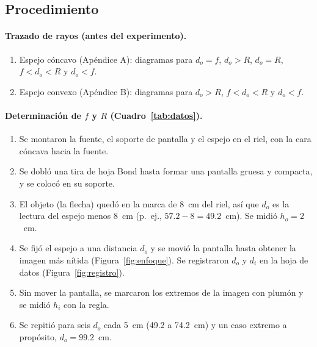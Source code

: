 \documentclass[11pt,a4paper]{article}
\begin{document}
\subsection{Procedimiento}

\paragraph{Trazado de rayos (antes del experimento).}
\begin{enumerate}
  \item Espejo cóncavo (Apéndice A): diagramas para $d_o = f$, $d_o > R$, $d_o = R$, $f < d_o < R$ y $d_o < f$.
  \item Espejo convexo (Apéndice B): diagramas para $d_o > R$, $f < d_o < R$ y $d_o < f$.
\end{enumerate}

\paragraph{Determinación de $f$ y $R$ (Cuadro~\ref{tab:datos}).}
\begin{enumerate}[resume]
  \item Se montaron la fuente, el soporte de pantalla y el espejo en el riel, con la cara cóncava hacia la fuente.
  \item Se dobló una tira de hoja Bond hasta formar una pantalla gruesa y compacta, y se colocó en su soporte.
  \item El objeto (la flecha) quedó en la marca de 8~cm del riel, así que $d_o$ es la lectura del espejo menos 8~cm (p.\ ej., $57.2 - 8 = 49.2$~cm). Se midió $h_o = 2$~cm.
  \item Se fijó el espejo a una distancia $d_o$ y se movió la pantalla hasta obtener la imagen más nítida (Figura~\ref{fig:enfoque}). Se registraron $d_o$ y $d_i$ en la hoja de datos (Figura~\ref{fig:registro}).
  \item Sin mover la pantalla, se marcaron los extremos de la imagen con plumón y se midió $h_i$ con la regla.
  \item Se repitió para seis $d_o$ cada 5~cm (49.2 a 74.2~cm) y un caso extremo a propósito, $d_o = 99.2$~cm.
\end{enumerate}
\end{document}
